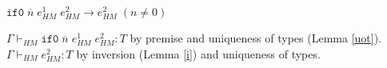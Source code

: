 \begin{case}
$\mathtt{if0}\;\overline{n}\;e_{HM}^{1}\;e_{HM}^{2}\rightarrow e_{HM}^{2}\;(n\neq0)$

$\Gamma\vdash_{HM}\mathtt{if0}\;\overline{n}\;e_{HM}^{1}\;e_{HM}^{2}:T$ by premise and uniqueness of types (Lemma \ref{uot}).  $\Gamma\vdash_{HM}e_{HM}^{2}:T$ by inversion (Lemma \ref{i}) and uniqueness of types.
\end{case}